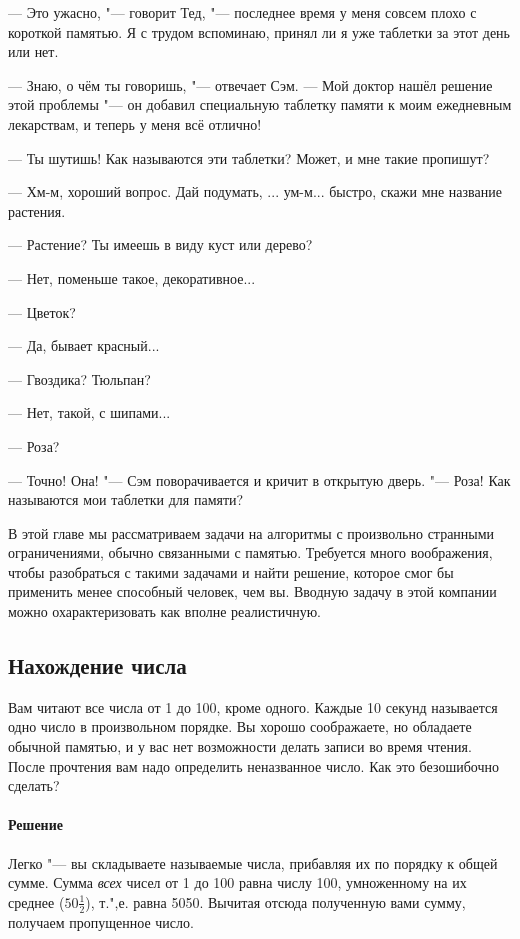 \documentclass[twoside]{book}
\makeatletter
\newcommand{\rindex}[2][\imki@jobname]{%
  \index[#1]{\detokenize{#2}}%
}
\makeatother
\begin{document}
--- Это ужасно, "--- говорит Тед, "--- последнее время у меня совсем плохо с короткой памятью.
Я с трудом вспоминаю, принял ли я уже таблетки за этот день или нет.

--- Знаю, о чём ты говоришь, "--- отвечает Сэм.
--- Мой доктор нашёл решение этой проблемы "--- он добавил специальную таблетку памяти к моим ежедневным лекарствам, и теперь у меня всё отлично!

--- Ты шутишь! Как называются эти таблетки? Может, и мне такие пропишут?

--- Хм-м, хороший вопрос.
Дай подумать, ... ум-м... быстро, скажи мне название растения.

--- Растение? Ты имеешь в виду куст или дерево?

--- Нет, поменьше такое, декоративное...

--- Цветок?

--- Да, бывает красный...

--- Гвоздика? Тюльпан?

--- Нет, такой, с шипами...

--- Роза?

--- Точно! Она! "--- Сэм поворачивается и кричит в открытую дверь. "--- Роза! Как называются мои таблетки для памяти?

\medskip

В этой главе мы рассматриваем задачи на алгоритмы с произвольно странными ограничениями, обычно связанными с памятью.
Требуется много воображения, чтобы разобраться с такими задачами и найти решение, которое смог бы применить менее способный человек, чем вы.
Вводную задачу в этой компании можно охарактеризовать как вполне реалистичную.

\subsection*{Нахождение числа}%
\rindex{Нахождение числа}

Вам читают все числа от 1 до 100, кроме одного.
Каждые 10 секунд называется одно число в произвольном порядке.
Вы хорошо соображаете, но обладаете обычной памятью, и у вас нет возможности делать записи во время чтения.
После прочтения вам надо определить неназванное число.
Как это безошибочно сделать?

\paragraph{Решение} Легко "--- вы складываете называемые числа, прибавляя их по порядку к общей сумме.
Сумма \emph{всех} чисел от 1 до 100 равна числу 100, умноженному на их среднее ($50\tfrac12$), т.",е. равна 5050.
Вычитая отсюда полученную вами сумму, получаем пропущенное число.
\end{document}
